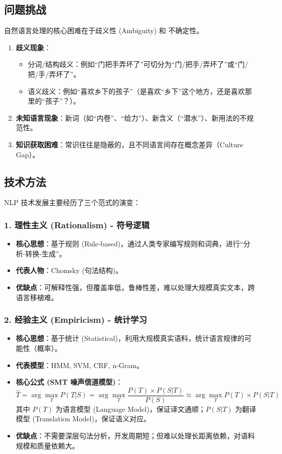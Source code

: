 \documentclass[a4paper, 11pt]{ctexart}
\begin{document}
\subsection{问题挑战}
自然语言处理的核心困难在于歧义性 (Ambiguity) 和 不确定性。
\begin{enumerate}
    \item \textbf{歧义现象}：
    \begin{itemize}
        \item 分词/结构歧义：例如“门把手弄坏了”可切分为“门/把手/弄坏了”或“门/把/手/弄坏了”。
        \item 语义歧义：例如“喜欢乡下的孩子”（是喜欢“乡下”这个地方，还是喜欢那里的“孩子”？）。
    \end{itemize}
    \item \textbf{未知语言现象}：新词（如“内卷”、“给力”）、新含义（“潜水”）、新用法的不规范性。
    \item \textbf{知识获取困难}：常识往往是隐蔽的，且不同语言间存在概念差异（Culture Gap）。
\end{enumerate}

\subsection{技术方法}
NLP 技术发展主要经历了三个范式的演变：

\subsubsection{1. 理性主义 (Rationalism) - 符号逻辑}
\begin{itemize}
    \item \textbf{核心思想}：基于规则 (Rule-based)，通过人类专家编写规则和词典，进行“分析-转换-生成”。
    \item \textbf{代表人物}：Chomsky (句法结构)。
    \item \textbf{优缺点}：可解释性强，但覆盖率低，鲁棒性差，难以处理大规模真实文本，跨语言移植难。
\end{itemize}

\subsubsection{2. 经验主义 (Empiricism) - 统计学习}
\begin{itemize}
    \item \textbf{核心思想}：基于统计 (Statistical)，利用大规模真实语料，统计语言规律的可能性（概率）。
    \item \textbf{代表模型}：HMM, SVM, CRF, n-Gram。
    \item \textbf{核心公式 (SMT 噪声信道模型)}：
    $$ \hat{T} = \arg \max_T P(T|S) = \arg \max_T \frac{P(T) \times P(S|T)}{P(S)} \approx \arg \max_T P(T) \times P(S|T) $$
    其中 $P(T)$ 为语言模型 (Language Model)，保证译文通顺；$P(S|T)$ 为翻译模型 (Translation Model)，保证语义对应。
    \item \textbf{优缺点}：不需要深层句法分析，开发周期短；但难以处理长距离依赖，对语料规模和质量依赖大。
\end{itemize}
\end{document}
